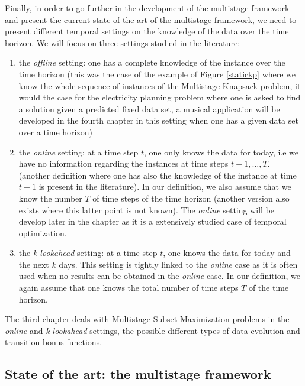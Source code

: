 \documentclass[a4paper]{book}
\begin{document}
Finally, in order to go further in the development of the multistage framework and present the current state of the art of the multistage framework, we need to present different temporal settings on the knowledge of the data over the time horizon. We will focus on three settings studied in the literature:
\begin{enumerate}
    \item the \emph{offline} setting: one has a complete knowledge of the instance over the time horizon (this was the case of the example of Figure \ref{statickp} where we know the whole sequence of instances of the {\sc Multistage Knapsack} problem, it would the case for the electricity planning problem where one is asked to find a solution given a predicted fixed data set, a musical application will be developed in the fourth chapter in this setting when one has a given data set over a time horizon)
    \item the \emph{online} setting: at a time step $t$, one only knows the data for today, i.e we have no information regarding the instances at time steps $t+1,\ldots,T$. (another definition where one has also the knowledge of the instance at time $t+1$ is present in the literature). In our definition, we also assume that we know the number $T$ of time steps of the time horizon (another version also exists where this latter point is not known). The \emph{online} setting will be develop later in the chapter as it is a extensively studied case of temporal optimization.
    \item the \emph{k-lookahead} setting: at a time step $t$, one knows the data for today and the next $k$ days. This setting is tightly linked to the \emph{online} case as it is often used when no results can be obtained in the \emph{online} case. In our definition, we again assume that one knows the total number of time steps $T$ of the time horizon. %
\end{enumerate}

The third chapter deals with {\sc Multistage Subset Maximization} problems in the \emph{online} and \emph{k-lookahead} settings, the possible different types of data evolution and transition bonus functions. 

\subsection{State of the art: the multistage framework}\label{multisota}
\end{document}
